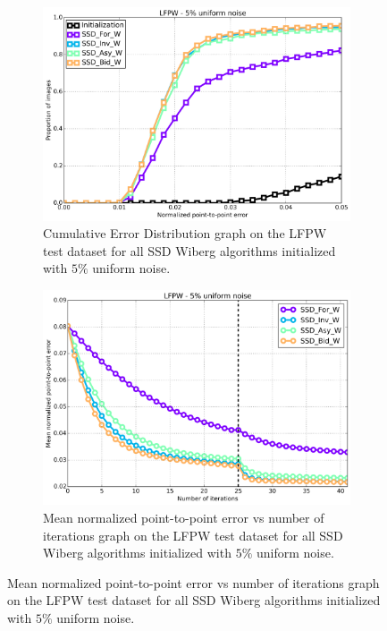 \begin{figure}[h!]
	\centering
	\begin{subfigure}{0.48\textwidth}
	    \includegraphics[width=\textwidth]{experiments/algorithms/ssd_w/ced_ssd_w_5.png}
	    \caption{Cumulative Error Distribution graph on the LFPW test dataset for all SSD Wiberg algorithms initialized with $5\%$ uniform noise.}
	    \label{fig:ced_ssd_w_5}
	\end{subfigure}
	\hfill
	\begin{subfigure}{0.48\textwidth}
	    \includegraphics[width=\textwidth]{experiments/algorithms/ssd_w/mean_error_vs_iters_ssd_w_5.png}
	    \caption{Mean normalized point-to-point error vs number of iterations graph on the LFPW test dataset for all SSD Wiberg algorithms initialized with $5\%$ uniform noise.}
	    \label{fig:mean_error_vs_iters_ssd_w_5}

\end{subfigure}
\end{figure}
